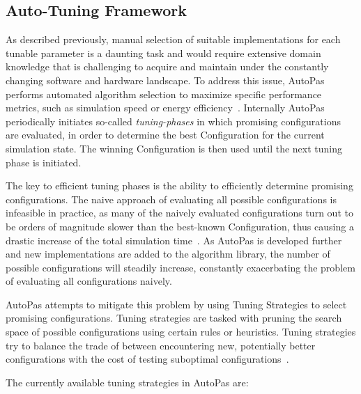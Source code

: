 \documentclass[conference]{IEEEtran}
\begin{document}
\subsection{Auto-Tuning Framework}

As described previously, manual selection of suitable implementations for each tunable parameter is a daunting task and would require extensive domain knowledge that is challenging to acquire and maintain under the constantly changing software and hardware landscape. To address this issue, AutoPas performs automated algorithm selection to maximize specific performance metrics, such as simulation speed or energy efficiency~\cite{Gratl2022AutoPas}. Internally AutoPas periodically initiates so-called \textit{tuning-phases} in which promising configurations are evaluated, in order to determine the best Configuration for the current simulation state. The winning Configuration is then used until the next tuning phase is initiated.

The key to efficient tuning phases is the ability to efficiently determine promising configurations. The naive approach of evaluating all possible configurations is infeasible in practice, as many of the naively evaluated configurations turn out to be orders of magnitude slower than the best-known Configuration, thus causing a drastic increase of the total simulation time~\cite{endreport.pdf}\cite{Manuel_Lerchner_Thesis.pdf}.
As AutoPas is developed further and new implementations are added to the algorithm library, the number of possible configurations will steadily increase, constantly exacerbating the problem of evaluating all configurations naively.

AutoPas attempts to mitigate this problem by using Tuning Strategies to select promising configurations. Tuning strategies are tasked with pruning the search space of possible configurations using certain rules or heuristics. Tuning strategies try to balance the trade of between encountering new, potentially better configurations with the cost of testing suboptimal configurations~\cite{Newcome2023Poster}.

The currently available tuning strategies in AutoPas are:
\end{document}
